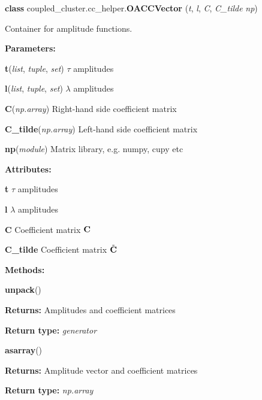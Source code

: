 \begin{tcolorbox}
    {\selectfont
    \textbf{class} coupled\_cluster.cc\_helper.\textbf{OACCVector}
    (\emph{t}, \emph{l}, \emph{C}, \emph{C\_tilde} \emph{np})

    \vspace{1em}
    Container for amplitude functions.

    \vspace{1em}
    \textbf{Parameters:}

    \hspace{2em}\textbf{t}(\emph{list}, \emph{tuple}, \emph{set}) $\tau$ amplitudes

    \hspace{2em}\textbf{l}(\emph{list}, \emph{tuple}, \emph{set}) $\lambda$ amplitudes

    \hspace{2em}\textbf{C}(\emph{np.array}) Right-hand side coefficient matrix

    \hspace{2em}\textbf{C\_tilde}(\emph{np.array}) Left-hand side coefficient matrix

    \hspace{2em}\textbf{np}(\emph{module}) Matrix library, e.g. numpy, cupy etc

    \vspace{1em}
    \textbf{Attributes:}

    \hspace{2em} \textbf{t} $\tau$ amplitudes

    \hspace{2em} \textbf{l} $\lambda$ amplitudes

    \hspace{2em} \textbf{C} Coefficient matrix $\vb{C}$ 

    \hspace{2em} \textbf{C\_tilde} Coefficient matrix $\tilde{\vb{C}}$

    \vspace{1em}
    \textbf{Methods:}

    \hspace{2em} \textbf{unpack}()
    \begin{adjustwidth}{4em}{}
        \textbf{Returns:} Amplitudes and coefficient matrices

        \textbf{Return type:} \emph{generator}
    \end{adjustwidth}

    \hspace{2em} \textbf{asarray}()
    \begin{adjustwidth}{4em}{}
        \textbf{Returns:} Amplitude vector and coefficient matrices

        \textbf{Return type:} \emph{np.array}
    \end{adjustwidth}

    }
\end{tcolorbox}